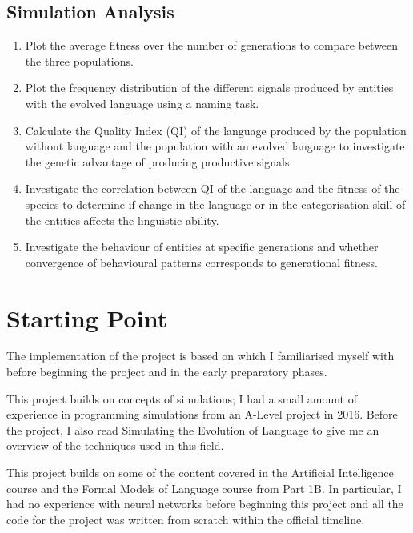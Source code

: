 \documentclass[12pt,a4paper]{report}
\begin{document}
\subsection*{Simulation Analysis}

\begin{enumerate}

\item Plot the average fitness over the number of generations to compare between the three populations.

\item Plot the frequency distribution of the different signals produced by entities with the evolved language using a naming task.

\item Calculate the Quality Index (QI) of the language produced by the population without language and the population with an evolved language to investigate the genetic advantage of producing productive signals. 

\item Investigate the correlation between QI of the language and the fitness of the species to determine if change in the language or in the categorisation skill of the entities affects the linguistic ability.

\item Investigate the behaviour of entities at specific generations and whether convergence of behavioural patterns corresponds to generational fitness.

\end{enumerate}

\section{Starting Point}\label{section:starting}

The implementation of the project is based on \citet{Cangelosi1998} which I familiarised myself with before beginning the project and in the early preparatory phases.

This project builds on concepts of simulations; I had a small amount of experience in programming simulations from an A-Level project in 2016. Before the project, I also read Simulating the Evolution of Language \citep{Cangelosi2002} to give me an overview of the techniques used in this field. 

This project builds on some of the content covered in the Artificial Intelligence course and the Formal Models of Language course from Part 1B. In particular, I had no experience with neural networks before beginning this project and all the code for the project was written from scratch within the official timeline.
\end{document}
